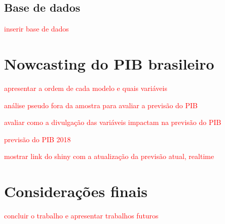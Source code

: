 \documentclass{article}
\begin{document}
\subsection{Base de dados}\label{base}

\textcolor{red}{inserir base de dados}

\section{Nowcasting do PIB brasileiro}\label{nowcastingBR}

\textcolor{red}{apresentar a ordem de cada modelo e quais variáveis}

\textcolor{red}{análise pseudo fora da amostra para avaliar a previsão do PIB}

\textcolor{red}{avaliar como a divulgação das variáveis impactam na previsão do PIB}

\textcolor{red}{previsão do PIB 2018}

\textcolor{red}{mostrar link do shiny com a atualização da previsão atual, realtime}

\section{Considerações finais}\label{conclusao}

\textcolor{red}{concluir o trabalho e apresentar trabalhos futuros}



\end{document}
